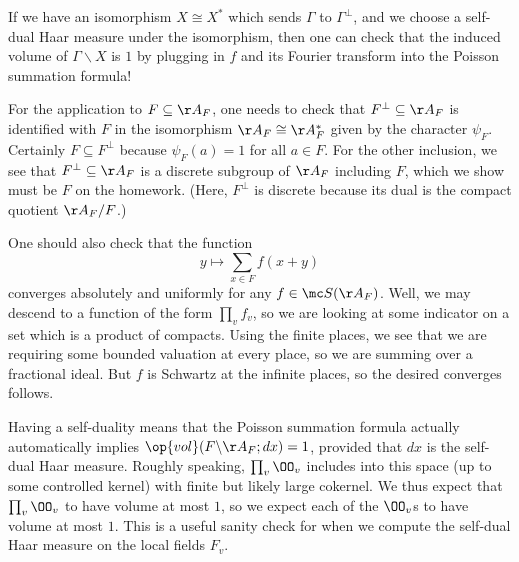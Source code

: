 \documentclass[../notes.tex]{subfiles}
\begin{document}
\begin{remark}
	If we have an isomorphism $X\cong X^*$ which sends $\Gamma$ to $\Gamma^\perp$, and we choose a self-dual Haar measure under the isomorphism, then one can check that the induced volume of $\Gamma\backslash X$ is $1$ by plugging in $f$ and its Fourier transform into the Poisson summation formula!
\end{remark}
\begin{example}
	For the application to $F\subseteq\AA_F$, one needs to check that $F^\perp\subseteq\AA_F$ is identified with $F$ in the isomorphism $\AA_F\cong\AA_F^*$ given by the character $\psi_F$. Certainly $F\subseteq F^\perp$ because $\psi_F(a)=1$ for all $a\in F$. For the other inclusion, we see that $F^\perp\subseteq\AA_F$ is a discrete subgroup of $\AA_F$ including $F$, which we show must be $F$ on the homework. (Here, $F^\perp$ is discrete because its dual is the compact quotient $\AA_F/F$.)
\end{example}
\begin{remark}
	One should also check that the function
	\[y\mapsto\sum_{x\in F}f(x+y)\]
	converges absolutely and uniformly for any $f\in\mc S(\AA_F)$. Well, we may descend to a function of the form $\prod_vf_v$, so we are looking at some indicator on a set which is a product of compacts. Using the finite places, we see that we are requiring some bounded valuation at every place, so we are summing over a fractional ideal. But $f$ is Schwartz at the infinite places, so the desired converges follows.
\end{remark}
\begin{remark}
	Having a self-duality means that the Poisson summation formula actually automatically implies $\op{vol}(F\backslash\AA_F;dx)=1$, provided that $dx$ is the self-dual Haar measure. Roughly speaking, $\prod_v\OO_v$ includes into this space (up to some controlled kernel) with finite but likely large cokernel. We thus expect that $\prod_v\OO_v$ to have volume at most $1$, so we expect each of the $\OO_v$s to have volume at most $1$. This is a useful sanity check for when we compute the self-dual Haar measure on the local fields $F_v$.
\end{remark}
\end{document}
